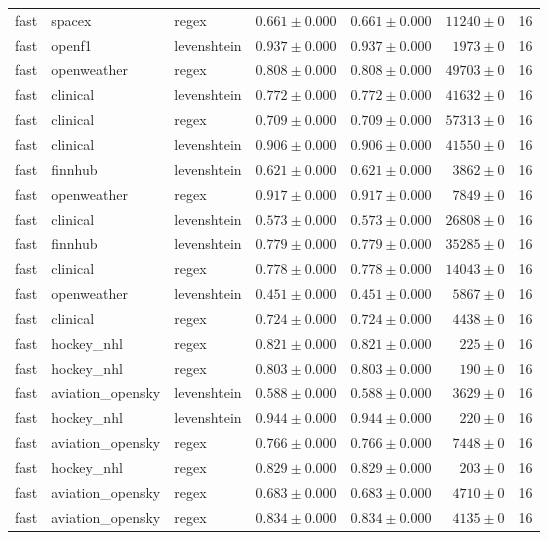\begin{table}[htbp]
\begin{tabular}{l l l r r r r}
fast & spacex & regex & $0.661\pm0.000$ & $0.661\pm0.000$ & $11240\pm0$ & 16 \\
fast & openf1 & levenshtein & $0.937\pm0.000$ & $0.937\pm0.000$ & $1973\pm0$ & 16 \\
fast & openweather & regex & $0.808\pm0.000$ & $0.808\pm0.000$ & $49703\pm0$ & 16 \\
fast & clinical & levenshtein & $0.772\pm0.000$ & $0.772\pm0.000$ & $41632\pm0$ & 16 \\
fast & clinical & regex & $0.709\pm0.000$ & $0.709\pm0.000$ & $57313\pm0$ & 16 \\
fast & clinical & levenshtein & $0.906\pm0.000$ & $0.906\pm0.000$ & $41550\pm0$ & 16 \\
fast & finnhub & levenshtein & $0.621\pm0.000$ & $0.621\pm0.000$ & $3862\pm0$ & 16 \\
fast & openweather & regex & $0.917\pm0.000$ & $0.917\pm0.000$ & $7849\pm0$ & 16 \\
fast & clinical & levenshtein & $0.573\pm0.000$ & $0.573\pm0.000$ & $26808\pm0$ & 16 \\
fast & finnhub & levenshtein & $0.779\pm0.000$ & $0.779\pm0.000$ & $35285\pm0$ & 16 \\
fast & clinical & regex & $0.778\pm0.000$ & $0.778\pm0.000$ & $14043\pm0$ & 16 \\
fast & openweather & levenshtein & $0.451\pm0.000$ & $0.451\pm0.000$ & $5867\pm0$ & 16 \\
fast & clinical & regex & $0.724\pm0.000$ & $0.724\pm0.000$ & $4438\pm0$ & 16 \\
fast & hockey\_nhl & regex & $0.821\pm0.000$ & $0.821\pm0.000$ & $225\pm0$ & 16 \\
fast & hockey\_nhl & regex & $0.803\pm0.000$ & $0.803\pm0.000$ & $190\pm0$ & 16 \\
fast & aviation\_opensky & levenshtein & $0.588\pm0.000$ & $0.588\pm0.000$ & $3629\pm0$ & 16 \\
fast & hockey\_nhl & levenshtein & $0.944\pm0.000$ & $0.944\pm0.000$ & $220\pm0$ & 16 \\
fast & aviation\_opensky & regex & $0.766\pm0.000$ & $0.766\pm0.000$ & $7448\pm0$ & 16 \\
fast & hockey\_nhl & regex & $0.829\pm0.000$ & $0.829\pm0.000$ & $203\pm0$ & 16 \\
fast & aviation\_opensky & regex & $0.683\pm0.000$ & $0.683\pm0.000$ & $4710\pm0$ & 16 \\
fast & aviation\_opensky & regex & $0.834\pm0.000$ & $0.834\pm0.000$ & $4135\pm0$ & 16 \\

\end{tabular}
\end{table}
